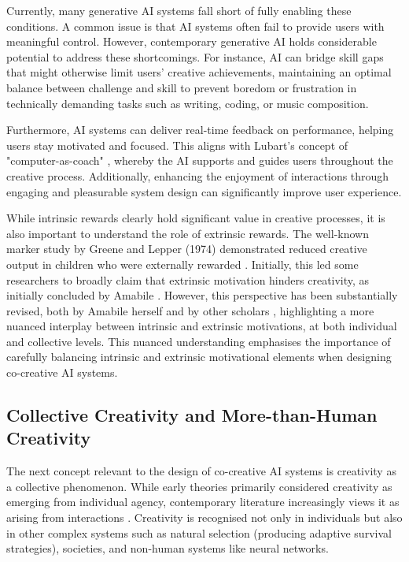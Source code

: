 Currently, many generative AI systems fall short of fully enabling these conditions. A common issue is that AI systems often fail to provide users with meaningful control. However, contemporary generative AI holds considerable potential to address these shortcomings. For instance, AI can bridge skill gaps that might otherwise limit users' creative achievements, maintaining an optimal balance between challenge and skill to prevent boredom or frustration in technically demanding tasks such as writing, coding, or music composition.

Furthermore, AI systems can deliver real-time feedback on performance, helping users stay motivated and focused. This aligns with Lubart’s concept of "computer-as-coach" \cite{Lubart2005-zi}, whereby the AI supports and guides users throughout the creative process. Additionally, enhancing the enjoyment of interactions through engaging and pleasurable system design can significantly improve user experience.

While intrinsic rewards clearly hold significant value in creative processes, it is also important to understand the role of extrinsic rewards. The well-known marker study by Greene and Lepper (1974) demonstrated reduced creative output in children who were externally rewarded \cite{Greene1974-rf}. Initially, this led some researchers to broadly claim that extrinsic motivation hinders creativity, as initially concluded by Amabile \cite{Amabile1983-lj}. However, this perspective has been substantially revised, both by Amabile herself \cite{Amabile1996-pt} and by other scholars \cite{Paul2023-cq, Bown2021-os}, highlighting a more nuanced interplay between intrinsic and extrinsic motivations, at both individual and collective levels. This nuanced understanding emphasises the importance of carefully balancing intrinsic and extrinsic motivational elements when designing co-creative AI systems.



\subsection{Collective Creativity and More-than-Human Creativity}

The next concept relevant to the design of co-creative AI systems is creativity as a collective phenomenon. While early theories primarily considered creativity as emerging from individual agency, contemporary literature increasingly views it as arising from interactions \cite{Bown2012-gg, Schaffer1994-gy, Csikszentmihalyi2015-rq, Csikszentmihalyi2014-cq, Amabile1996-pt, Rhodes1961-od}. Creativity is recognised not only in individuals but also in other complex systems such as natural selection (producing adaptive survival strategies), societies, and non-human systems like neural networks.

